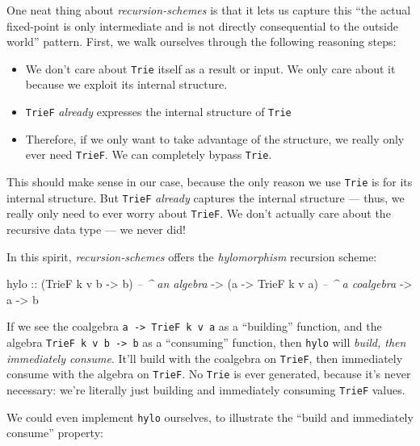 \documentclass[]{article}
\newenvironment{Shaded}{}{}
\newcommand{\CommentTok}[1]{\textcolor[rgb]{0.38,0.63,0.69}{\textit{#1}}}
\newcommand{\DataTypeTok}[1]{\textcolor[rgb]{0.56,0.13,0.00}{#1}}
\newcommand{\NormalTok}[1]{#1}
\newcommand{\OtherTok}[1]{\textcolor[rgb]{0.00,0.44,0.13}{#1}}
\begin{document}
One neat thing about \emph{recursion-schemes} is that it lets us capture this
``the actual fixed-point is only intermediate and is not directly consequential
to the outside world'' pattern. First, we walk ourselves through the following
reasoning steps:

\begin{itemize}
\tightlist
\item
  We don't care about \texttt{Trie} itself as a result or input. We only care
  about it because we exploit its internal structure.
\item
  \texttt{TrieF} \emph{already} expresses the internal structure of
  \texttt{Trie}
\item
  Therefore, if we only want to take advantage of the structure, we really only
  ever need \texttt{TrieF}. We can completely bypass \texttt{Trie}.
\end{itemize}

This should make sense in our case, because the only reason we use \texttt{Trie}
is for its internal structure. But \texttt{TrieF} \emph{already} captures the
internal structure --- thus, we really only need to ever worry about
\texttt{TrieF}. We don't actually care about the recursive data type --- we
never did!

In this spirit, \emph{recursion-schemes} offers the \emph{hylomorphism}
recursion scheme:

\begin{Shaded}
\begin{Highlighting}[]
\NormalTok{hylo}
\OtherTok{    ::}\NormalTok{ (}\DataTypeTok{TrieF}\NormalTok{ k v b }\OtherTok{->}\NormalTok{ b)   }\CommentTok{-- ^ an algebra}
    \OtherTok{->}\NormalTok{ (a }\OtherTok{->} \DataTypeTok{TrieF}\NormalTok{ k v a)   }\CommentTok{-- ^ a coalgebra}
    \OtherTok{->}\NormalTok{ a}
    \OtherTok{->}\NormalTok{ b}
\end{Highlighting}
\end{Shaded}

If we see the coalgebra \texttt{a\ -\textgreater{}\ TrieF\ k\ v\ a} as a
``building'' function, and the algebra
\texttt{TrieF\ k\ v\ b\ -\textgreater{}\ b} as a ``consuming'' function, then
\texttt{hylo} will \emph{build, then immediately consume}. It'll build with the
coalgebra on \texttt{TrieF}, then immediately consume with the algebra on
\texttt{TrieF}. No \texttt{Trie} is ever generated, because it's never
necessary: we're literally just building and immediately consuming
\texttt{TrieF} values.

We could even implement \texttt{hylo} ourselves, to illustrate the ``build and
immediately consume'' property:
\end{document}
